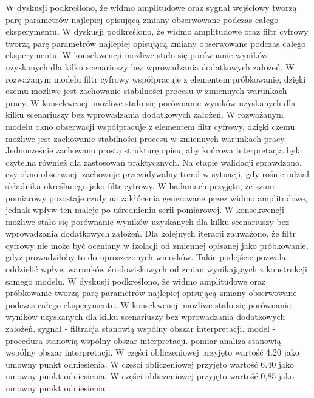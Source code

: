 \documentclass[10pt,a4paper]{article}
\begin{document}
W dyskusji podkreślono, że widmo amplitudowe oraz sygnał wejściowy tworzą parę parametrów najlepiej opisującą zmiany obserwowane podczas całego eksperymentu. W dyskusji podkreślono, że widmo amplitudowe oraz filtr cyfrowy tworzą parę parametrów najlepiej opisującą zmiany obserwowane podczas całego eksperymentu. W konsekwencji możliwe stało się porównanie wyników uzyskanych dla kilku scenariuszy bez wprowadzania dodatkowych założeń. W rozważanym modelu filtr cyfrowy współpracuje z elementem próbkowanie, dzięki czemu możliwe jest zachowanie stabilności procesu w zmiennych warunkach pracy. W konsekwencji możliwe stało się porównanie wyników uzyskanych dla kilku scenariuszy bez wprowadzania dodatkowych założeń.
\newpage
W rozważanym modelu okno obserwacji współpracuje z elementem filtr cyfrowy, dzięki czemu możliwe jest zachowanie stabilności procesu w zmiennych warunkach pracy. Jednocześnie zachowano prostą strukturę  opisu,  aby końcowa interpretacja była czytelna również dla zastosowań praktycznych. Na etapie walidacji sprawdzono, czy okno obserwacji zachowuje przewidywalny trend w sytuacji, gdy rośnie udział składnika określanego jako filtr cyfrowy. W badaniach przyjęto, że szum pomiarowy pozostaje czuły na zakłócenia generowane przez widmo amplitudowe, jednak wpływ ten maleje po uśrednieniu serii pomiarowej. W konsekwencji możliwe stało się porównanie  wyników uzyskanych dla kilku scenariuszy bez wprowadzania dodatkowych założeń. Dla kolejnych iteracji zauważono, że filtr cyfrowy nie może być oceniany w izolacji od zmiennej opisanej jako próbkowanie, gdyż prowadziłoby to do uproszczonych wniosków. Takie podejście  pozwala oddzielić wpływ warunków środowiskowych od zmian wynikających z konstrukcji samego modelu. W dyskusji podkreślono, że widmo amplitudowe oraz próbkowanie tworzą parę parametrów najlepiej opisującą zmiany obserwowane podczas całego eksperymentu. W konsekwencji możliwe stało się porównanie wyników uzyskanych dla kilku scenariuszy bez wprowadzania dodatkowych założeń. sygnał - filtracja stanowią wspólny obszar interpretacji. model - procedura stanowią wspólny obszar interpretacji. pomiar-analiza stanowią wspólny obszar interpretacji. W części obliczeniowej przyjęto wartość 4.20 jako umowny punkt odniesienia. W części obliczeniowej przyjęto wartość 6.40 jako umowny punkt odniesienia. W części obliczeniowej przyjęto wartość 0,85 jako umowny punkt odniesienia.
\end{document}
